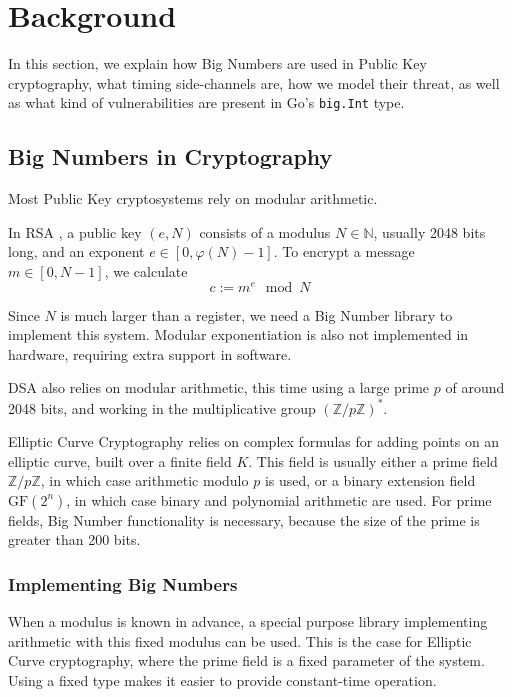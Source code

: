 \documentclass[11pt, a4paper]{article} %
\begin{document}
{\section{Background}

In this section, we explain how Big Numbers are used in Public Key
cryptography, what timing side-channels are, how we model their threat,
as well as what kind of vulnerabilities are present in Go's
\texttt{big.Int} type.

\subsection{Big Numbers in Cryptography}

Most Public Key cryptosystems rely on
modular arithmetic.

In RSA \cite{rivest_method_1978}, a public key $(e, N)$ consists
of a modulus
$N \in \mathbb{N}$, usually 2048 bits long, and an exponent $e
\in [0, \varphi(N) - 1]$.
To encrypt a message $m \in [0, N - 1]$, we calculate
$$
c := m^e \mod N
$$

Since $N$ is much larger than a register, 
we need a Big Number library to implement this system.
Modular exponentiation is also not implemented in hardware,
requiring extra support in software.

DSA
\cite{technology_digital_1994} also relies on modular arithmetic,
this time using a large prime $p$ of around 2048 bits, and working
in the multiplicative group $(\mathbb{Z}/p\mathbb{Z})^*$.

Elliptic Curve Cryptography
\cite{miller_use_1986} relies on complex formulas for adding points
on an elliptic curve, built over a finite field $K$. This field
is usually either a prime field $\mathbb{Z}/p\mathbb{Z}$, in which case arithmetic
modulo $p$ is used, or a
binary extension field $\text{GF}(2^n)$, in which case
binary and polynomial arithmetic are used.
For prime fields, Big Number functionality is necessary, because
the size of the prime is greater than 200 bits.

\subsubsection{Implementing Big Numbers}

When a modulus is known in advance, a special purpose
library implementing arithmetic with this fixed modulus
can be used. This is the case for Elliptic Curve cryptography,
where the prime field is a fixed parameter of the system.
Using a fixed type makes it easier to provide constant-time operation.

}
\end{document}

